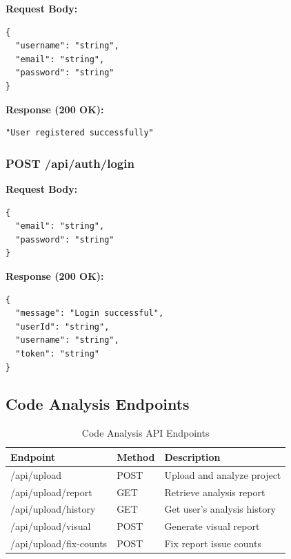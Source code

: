 \documentclass[12pt,a4paper]{article}
\begin{document}
    \textbf{Request Body:}
    \begin{verbatim}
{
  "username": "string",
  "email": "string",
  "password": "string"
}
    \end{verbatim}

    \textbf{Response (200 OK):}
    \begin{verbatim}
"User registered successfully"
    \end{verbatim}

    \subsubsection{POST /api/auth/login}

    \textbf{Request Body:}
    \begin{verbatim}
{
  "email": "string",
  "password": "string"
}
    \end{verbatim}

    \textbf{Response (200 OK):}
    \begin{verbatim}
{
  "message": "Login successful",
  "userId": "string",
  "username": "string",
  "token": "string"
}
    \end{verbatim}

    \subsection{Code Analysis Endpoints}

    \begin{table}[H]
        \caption{Code Analysis API Endpoints}
        \begin{tabular}{|l|l|p{5cm}|}
            \hline
            \textbf{Endpoint} & \textbf{Method} & \textbf{Description} \\
            \hline
            /api/upload & POST & Upload and analyze project \\
            \hline
            /api/upload/report & GET & Retrieve analysis report \\
            \hline
            /api/upload/history & GET & Get user's analysis history \\
            \hline
            /api/upload/visual & POST & Generate visual report \\
            \hline
            /api/upload/fix-counts & POST & Fix report issue counts \\
            \hline
        \end{tabular}
    \end{table}
\end{document}
